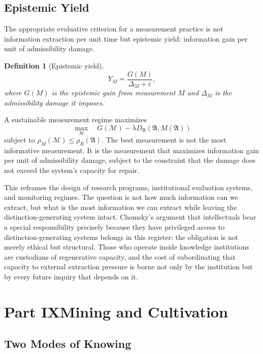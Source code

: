 \documentclass[12pt, a4paper]{article}
\theoremstyle{flyxion}
\newtheorem{definition}{Definition}
\newcommand{\fA}{\mathfrak{A}}
\newcommand{\cM}{\mathcal{M}}
\newcommand{\DA}{D_{\fA}}
\newcommand{\rhoM}{\rho_{M}}
\newcommand{\rhoR}{\rho_{R}}
\begin{document}
\subsection*{Epistemic Yield}

The appropriate evaluative criterion for a measurement practice is not information extraction per unit time but epistemic yield: information gain per unit of admissibility damage.

\begin{definition}[Epistemic yield]
\[
  Y_M = \frac{G(M)}{\Delta_M + \varepsilon},
\]
where $G(M)$ is the epistemic gain from measurement $M$ and $\Delta_M$ is the admissibility damage it imposes.
\end{definition}

A sustainable measurement regime maximizes
\[
  \max_{\cM} \quad G(\cM) - \lambda \DA(\fA, M(\fA))
\]
subject to $\rhoM(\cM) \leq \rhoR(\fA)$. The best measurement is not the most informative measurement. It is the measurement that maximizes information gain per unit of admissibility damage, subject to the constraint that the damage does not exceed the system's capacity for repair.

This reframes the design of research programs, institutional evaluation systems, and monitoring regimes. The question is not how much information can we extract, but what is the most information we can extract while leaving the distinction-generating system intact. Chomsky's argument that intellectuals bear a special responsibility precisely because they have privileged access to distinction-generating systems \cite{chomsky1967} belongs in this register: the obligation is not merely ethical but structural. Those who operate inside knowledge institutions are custodians of regenerative capacity, and the cost of subordinating that capacity to external extraction pressure is borne not only by the institution but by every future inquiry that depends on it.


\section*{Part IX\quad Mining and Cultivation}

\subsection*{Two Modes of Knowing}
\end{document}
